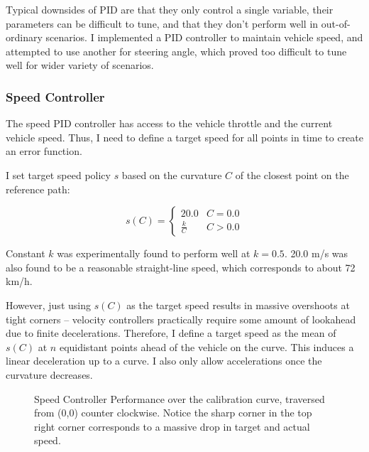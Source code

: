 \documentclass[a4paper,12pt,twoside,openright]{report}
\begin{document}
Typical downsides of PID are that they only control a single variable, their
parameters can be difficult to tune, and that they don't perform
well in out-of-ordinary scenarios. I implemented a PID controller to 
maintain vehicle speed, and attempted to use another for steering angle,
which proved too difficult to tune well for wider variety of scenarios.
 
\subsubsection{Speed Controller}

The speed PID controller has access to the vehicle throttle 
and the current vehicle speed. Thus, I need to define
a target speed for all points in time to create an error function.

I set target speed policy $s$ based on the curvature $C$ of the 
closest point on the reference path:

\[
    s(C) = 
    \begin{cases} 
      20.0   & C = 0.0 \\
      \frac{k}{C} & C > 0.0 
   \end{cases}
\]

Constant $k$ was experimentally found to perform well at $k=0.5$.
20.0 m/s was also found to be a reasonable straight-line speed, which corresponds
to about 72 km/h.

However, just using $s(C)$ as the target speed results in massive overshoots
at tight corners -- velocity controllers practically require some amount of lookahead
due to finite decelerations. Therefore, I define a target speed as the mean of 
$s(C)$ at $n$ equidistant points ahead of the vehicle on the curve.
This induces a linear deceleration up to a curve. I also only allow accelerations
once the curvature decreases.

\begin{figure}
\centering
\begin{subfigure}{0.55\textwidth}
    \centering
    
    \label{fig:ekf:speed controller}
\end{subfigure}
\begin{subfigure}{0.4\textwidth}
    \centering
    
    \label{fig:ekf:calibration plain}
\end{subfigure}
\caption[Speed Controller]{Speed Controller Performance over the calibration curve, traversed from (0,0) counter clockwise. Notice the sharp
corner in the top right corner corresponds to a massive drop in target and actual speed.}
\label{fig:impl:speedcontroller}
\end{figure}
\end{document}
